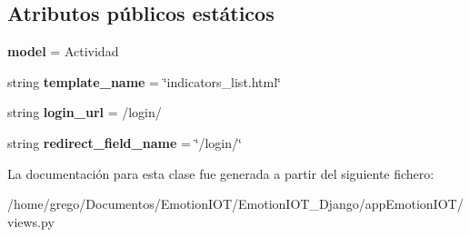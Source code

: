 \subsection*{Atributos públicos estáticos}
\begin{DoxyCompactItemize}
\item 
{\bfseries model} = Actividad\hypertarget{classappEmotionIOT_1_1views_1_1Lista__Indicadores_a172a8b255613195596aa049ea1bea86e}{}\label{classappEmotionIOT_1_1views_1_1Lista__Indicadores_a172a8b255613195596aa049ea1bea86e}

\item 
string {\bfseries template\+\_\+name} = \char`\"{}indicators\+\_\+list.\+html\char`\"{}\hypertarget{classappEmotionIOT_1_1views_1_1Lista__Indicadores_a42e6ea93f117a8aef5b4de100108d4b6}{}\label{classappEmotionIOT_1_1views_1_1Lista__Indicadores_a42e6ea93f117a8aef5b4de100108d4b6}

\item 
string {\bfseries login\+\_\+url} = \textquotesingle{}/login/\textquotesingle{}\hypertarget{classappEmotionIOT_1_1views_1_1Lista__Indicadores_a16435005ec3e116cec88fadb06d9bfec}{}\label{classappEmotionIOT_1_1views_1_1Lista__Indicadores_a16435005ec3e116cec88fadb06d9bfec}

\item 
string {\bfseries redirect\+\_\+field\+\_\+name} = \char`\"{}/login/\char`\"{}\hypertarget{classappEmotionIOT_1_1views_1_1Lista__Indicadores_a8aa286a70a481d610992c88c97d61f37}{}\label{classappEmotionIOT_1_1views_1_1Lista__Indicadores_a8aa286a70a481d610992c88c97d61f37}

\end{DoxyCompactItemize}


La documentación para esta clase fue generada a partir del siguiente fichero\+:\begin{DoxyCompactItemize}
\item 
/home/grego/\+Documentos/\+Emotion\+I\+O\+T/\+Emotion\+I\+O\+T\+\_\+\+Django/app\+Emotion\+I\+O\+T/views.\+py\end{DoxyCompactItemize}
